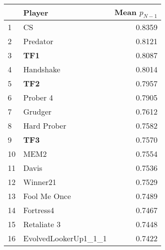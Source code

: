 \begin{tabular}{llr}
\toprule
{} &                Player &  Mean $p_{N-1}$ \\
\midrule
1  &                    CS &          0.8359 \\
2  &              Predator &          0.8121 \\
3  &                   \textbf{TF1} &          0.8087 \\
4  &             Handshake &          0.8014 \\
5  &                   \textbf{TF2} &          0.7957 \\
6  &              Prober 4 &          0.7905 \\
7  &               Grudger &          0.7612 \\
8  &           Hard Prober &          0.7582 \\
9  &                   \textbf{TF3} &          0.7570 \\
10 &                  MEM2 &          0.7554 \\
11 &                 Davis &          0.7536 \\
12 &              Winner21 &          0.7529 \\
13 &          Fool Me Once &          0.7489 \\
14 &             Fortress4 &          0.7467 \\
15 &           Retaliate 3 &          0.7448 \\
16 &  EvolvedLookerUp1\_1\_1 &          0.7422 \\
\bottomrule
\end{tabular}
